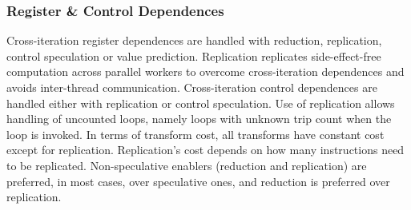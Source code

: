 %




\subsubsection{Register \& Control Dependences}

Cross-iteration register dependences
are handled with reduction, replication, control speculation or value
prediction. Replication replicates side-effect-free computation across
parallel workers to overcome cross-iteration dependences and avoids
inter-thread communication.
%
Cross-iteration control dependences are handled either with
replication or control speculation.
Use of replication allows handling of uncounted loops, namely loops
with unknown trip count when the loop is invoked.
%
In terms of transform cost, all transforms have constant
cost except for replication.  Replication's cost depends on how many
instructions need to be replicated. Non-speculative enablers
(reduction and replication) are preferred, in most cases, over
speculative ones, and reduction is preferred over replication.

